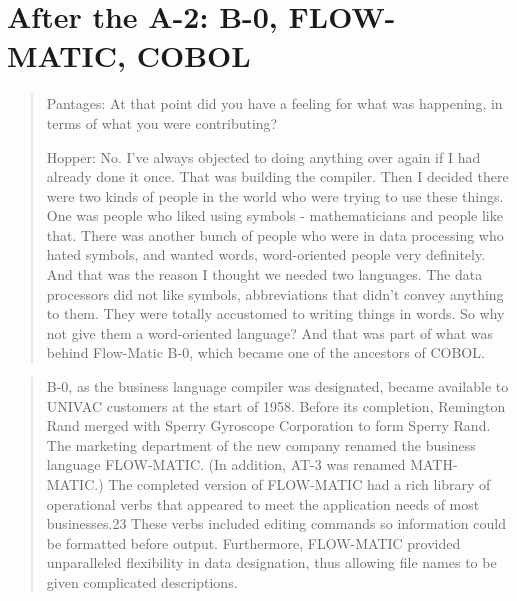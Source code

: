 
\section{After the A-2: B-0, FLOW-MATIC, COBOL}

\begin{quotation}
  Pantages: At that point did you have a feeling for what was
  happening, in terms of what you
  were contributing?

  Hopper: No. I've always objected to doing anything over again if I
  had already done it
  once. That was building the compiler. Then I decided there were two
  kinds of people in the
  world who were trying to use these things. One was people who liked
  using symbols -
  mathematicians and people like that. There was another bunch of
  people who were in data
  processing who hated symbols, and wanted words, word-oriented
  people very definitely. And
  that was the reason I thought we needed two languages.
  The data processors did not like symbols, abbreviations that didn't
  convey anything to them.
  They were totally accustomed to writing things in words. So why not
  give them a word-oriented
  language? And that was part of what was behind Flow-Matic B-0,
  which became one of the
  ancestors of COBOL.
\end{quotation}


\begin{quotation}
  B-0, as the business language compiler was designated, became available to
  UNIVAC customers at the start of 1958. Before its completion, Remington Rand
  merged with Sperry Gyroscope Corporation to form Sperry Rand. The marketing
  department of the new company renamed the business language FLOW-MATIC. (In
  addition, AT-3 was renamed MATH-MATIC.) The completed version of
  FLOW-MATIC had
  a rich library of operational verbs that appeared to meet the application
  needs of most businesses.23 These verbs included editing commands so
  information could be formatted before output. Furthermore, FLOW-MATIC provided
  unparalleled flexibility in data designation, thus allowing file names to be
  given complicated descriptions.
\end{quotation}

